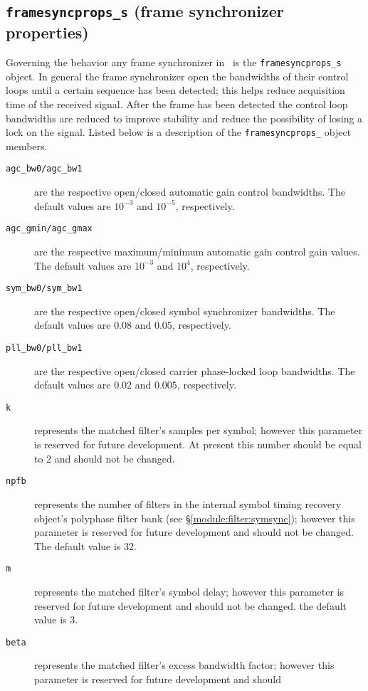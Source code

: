 \subsection{{\tt framesyncprops\_s} (frame synchronizer properties)}
\label{module:framing:framesyncprops_s}
Governing the behavior any frame synchronizer in \liquid\ is the
{\tt framesyncprops\_s} object.
In general the frame synchronizer open the bandwidths of their control
loops until a certain sequence has been detected;
this helps reduce acquisition time of the received signal.
After the frame has been detected the control loop bandwidths are
reduced to improve stability and reduce the possibility of losing a lock
on the signal.
Listed below is a description of the {\tt framesyncprops\_} object
members.
%
\begin{description}
\item[{\tt agc\_bw0/agc\_bw1}]
    are the respective open/closed automatic gain control bandwidths.
    The default values are $10^{-3}$ and $10^{-5}$, respectively.
\item[{\tt agc\_gmin/agc\_gmax}]
    are the respective maximum/minimum automatic gain control gain values.
    The default values are $10^{-3}$ and $10^{4}$, respectively.
\item[{\tt sym\_bw0/sym\_bw1}]
    are the respective open/closed symbol synchronizer bandwidths.
    The default values are $0.08$ and $0.05$, respectively.
\item[{\tt pll\_bw0/pll\_bw1}]
    are the respective open/closed carrier phase-locked loop bandwidths.
    The default values are $0.02$ and $0.005$, respectively.
\item[{\tt k}]
    represents the matched filter's samples per symbol;
    however this parameter is reserved for future development.
    At present this number should be equal to 2 and should not be
    changed.
\item[{\tt npfb}]
    represents the number of filters in the internal symbol timing
    recovery object's polyphase filter bank
    (see \S\ref{module:filter:symsync});
    however this parameter is reserved for future development and should
    not be changed.
    The default value is 32.
\item[{\tt m}]
    represents the matched filter's symbol delay;
    however this parameter is reserved for future development and should
    not be changed.
    the default value is 3.
\item[{\tt beta}]
    represents the matched filter's excess bandwidth factor;
    however this parameter is reserved for future development and should

\end{description}
